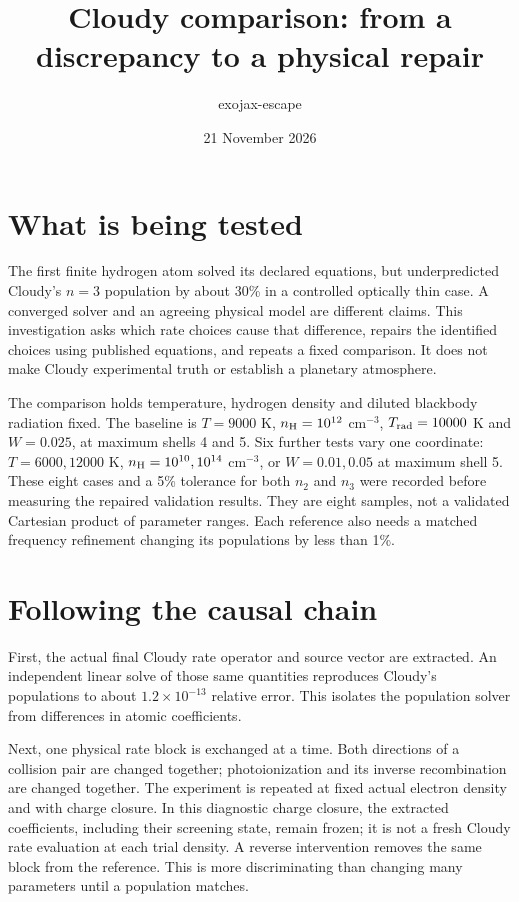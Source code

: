 \documentclass[11pt,a4paper]{article}
\title{Cloudy comparison: from a discrepancy to a physical repair}
\author{exojax-escape}
\date{21 November 2026}
\begin{document}
\maketitle

\section{What is being tested}
The first finite hydrogen atom solved its declared equations, but underpredicted
Cloudy's $n=3$ population by about 30\% in a controlled optically thin case.
A converged solver and an agreeing physical model are different claims. This
investigation asks which rate choices cause that difference, repairs the
identified choices using published equations, and repeats a fixed comparison.
It does not make Cloudy experimental truth or establish a planetary atmosphere.

The comparison holds temperature, hydrogen density and diluted blackbody
radiation fixed. The baseline is $T=9000$ K, $n_{\rm H}=10^{12}$ cm$^{-3}$,
$T_{\rm rad}=10000$ K and $W=0.025$, at maximum shells 4 and 5.
Six further tests vary one coordinate: $T=6000,12000$ K,
$n_{\rm H}=10^{10},10^{14}$ cm$^{-3}$, or $W=0.01,0.05$ at maximum shell 5.
These eight cases and a 5\% tolerance for both $n_2$ and $n_3$ were recorded
before measuring the repaired validation results. They are eight samples,
not a validated Cartesian product of parameter ranges. Each reference also
needs a matched frequency refinement changing its populations by less than 1\%.

\section{Following the causal chain}
First, the actual final Cloudy rate operator and source vector are extracted.
An independent linear solve of those same quantities reproduces Cloudy's
populations to about $1.2\times10^{-13}$ relative error. This isolates the
population solver from differences in atomic coefficients.

Next, one physical rate block is exchanged at a time. Both directions of a
collision pair are changed together; photoionization and its inverse
recombination are changed together. The experiment is repeated at fixed
actual electron density and with charge closure. In this diagnostic charge
closure, the extracted coefficients, including their screening state, remain
frozen; it is not a fresh Cloudy rate evaluation at each trial density. A reverse intervention
removes the same block from the reference. This is more discriminating than
changing many parameters until a population matches.
\end{document}
